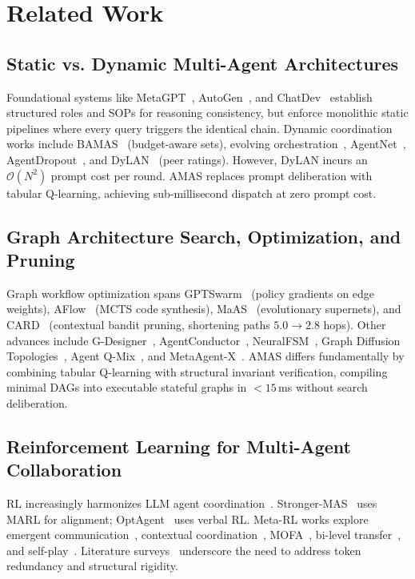 \documentclass[conference]{IEEEtran}
\begin{document}
\section{Related Work}
\label{sec:related_work}

\subsection{Static vs. Dynamic Multi-Agent Architectures}
Foundational systems like MetaGPT~\cite{hong2024metagpt}, AutoGen~\cite{wu2023autogen}, and ChatDev~\cite{qian2024chatdev} establish structured roles and SOPs for reasoning consistency, but enforce monolithic static pipelines where every query triggers the identical chain. Dynamic coordination works include BAMAS~\cite{Yang2026BAMAS} (budget-aware sets), evolving orchestration~\cite{dang2025multiagent}, AgentNet~\cite{yang2025agentnet}, AgentDropout~\cite{xiao2026agentdropout}, and DyLAN~\cite{liu2024dylan} (peer ratings). However, DyLAN incurs an $\mathcal{O}(N^2)$ prompt cost per round. AMAS replaces prompt deliberation with tabular Q-learning, achieving sub-millisecond dispatch at zero prompt cost.

\subsection{Graph Architecture Search, Optimization, and Pruning}
Graph workflow optimization spans GPTSwarm~\cite{zhuge2024gptswarm} (policy gradients on edge weights), AFlow~\cite{zhang2024aflow} (MCTS code synthesis), MaAS~\cite{Zhang2025MaAS} (evolutionary supernets), and CARD~\cite{Li2025AdaptiveGraphPruning} (contextual bandit pruning, shortening paths $5.0 \to 2.8$ hops). Other advances include G-Designer~\cite{zhang2025gdesigner}, AgentConductor~\cite{wang2026agentconductor}, NeuralFSM~\cite{wang2026neuralfsm}, Graph Diffusion Topologies~\cite{Jiang2026GTD}, Agent Q-Mix~\cite{jiang2026agentqmix}, and MetaAgent-X~\cite{Zhang2026MetaAgentX}. AMAS differs fundamentally by combining tabular Q-learning with structural invariant verification, compiling minimal DAGs into executable stateful graphs in $<15$\,ms without search deliberation.

\subsection{Reinforcement Learning for Multi-Agent Collaboration}
RL increasingly harmonizes LLM agent coordination~\cite{liu2026llm,Zhao2026StrongerMAS,bi2025optagent,Wan2025ReMA,Yang2026LearningToDeliberate,Zhou2026ResMAS,rjoub2026aamc}. Stronger-MAS~\cite{Zhao2026StrongerMAS} uses MARL for alignment; OptAgent~\cite{bi2025optagent} uses verbal RL. Meta-RL works explore emergent communication~\cite{Kashikar2025MetaRL}, contextual coordination~\cite{Huang2024AdaptiveMARL}, MOFA~\cite{Fu2026MOFA}, bi-level transfer~\cite{zhang2025bilevel}, and self-play~\cite{Mali2026SelfPlay,li2020adaptive}. Literature surveys~\cite{Cao2025TNNLSSurvey,sun2024llmmarl,lee2026survey} underscore the need to address token redundancy and structural rigidity.
\end{document}
